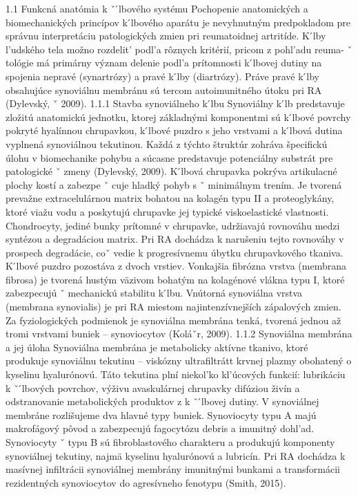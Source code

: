 { 1.1 Funkcná anatómia k ˇ  ́lbového systému Pochopenie anatomických a biomechanických princípov k ́lbového aparátu je nevyhnutným predpokladom pre správnu interpretáciu patologických zmien pri reumatoidnej artritíde. K ́lby l’udského tela možno rozdelit’ podl’a rôznych kritérií, pricom z pohl’adu reuma- ˇ tológie má primárny význam delenie podl’a prítomnosti k ́lbovej dutiny na spojenia nepravé (synartrózy) a pravé k ́lby (diartrózy). Práve pravé k ́lby obsahujúce synoviálnu membránu sú tercom autoimunitného útoku pri RA (Dylevský, ˇ 2009).
 1.1.1 Stavba synoviálneho k ́lbu Synoviálny k ́lb predstavuje zložitú anatomickú jednotku, ktorej základnými komponentmi sú k ́lbové povrchy pokryté hyalínnou chrupavkou, k ́lbové puzdro s jeho vrstvami a k ́lbová dutina vyplnená synoviálnou tekutinou. Každá z týchto štruktúr zohráva špecifickú úlohu v biomechanike pohybu a súcasne predstavuje potenciálny substrát pre patologické ˇ zmeny (Dylevský, 2009).
 K ́lbová chrupavka pokrýva artikulacné plochy kostí a zabezpe ˇ cuje hladký pohyb s ˇ minimálnym trením. Je tvorená prevažne extracelulárnou matrix bohatou na kolagén typu II a proteoglykány, ktoré viažu vodu a poskytujú chrupavke jej typické viskoelastické vlastnosti.
 Chondrocyty, jediné bunky prítomné v chrupavke, udržiavajú rovnováhu medzi syntézou a degradáciou matrix. Pri RA dochádza k narušeniu tejto rovnováhy v prospech degradácie, coˇ vedie k progresívnemu úbytku chrupavkového tkaniva.
 K ́lbové puzdro pozostáva z dvoch vrstiev. Vonkajšia fibrózna vrstva (membrana fibrosa) je tvorená hustým väzivom bohatým na kolagénové vlákna typu I, ktoré zabezpecujú ˇ mechanickú stabilitu k ́lbu. Vnútorná synoviálna vrstva (membrana synovialis) je pri RA miestom najintenzívnejších zápalových zmien. Za fyziologických podmienok je synoviálna membrána tenká, tvorená jednou až tromi vrstvami buniek – synoviocytov (Koláˇr, 2009).
 1.1.2 Synoviálna membrána a jej úloha Synoviálna membrána je metabolicky aktívne tkanivo, ktoré produkuje synoviálnu tekutinu – viskózny ultrafiltrátt krvnej plazmy obohatený o kyselinu hyalurónovú. Táto tekutina plní niekol’ko kl’úcových funkcií: lubrikáciu k ˇ  ́lbových povrchov, výživu avaskulárnej chrupavky difúziou živín a odstranovanie metabolických produktov z k ˇ  ́lbovej dutiny.
 V synoviálnej membráne rozlišujeme dva hlavné typy buniek. Synoviocyty typu A majú makrofágový pôvod a zabezpecujú fagocytózu debris a imunitný dohl’ad. Synoviocyty ˇ typu B sú fibroblastového charakteru a produkujú komponenty synoviálnej tekutiny, najmä kyselinu hyalurónovú a lubricín. Pri RA dochádza k masívnej infiltrácii synoviálnej membrány imunitnými bunkami a transformácii rezidentných synoviocytov do agresívneho fenotypu (Smith, 2015).
}
